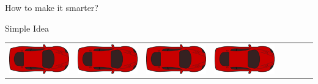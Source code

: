 \documentclass{do}
\begin{document}
\begin{frame}{How to make it smarter?}
\begin{exampleblock}{Simple Idea}
\begin{tabular}{c|c|c|c|c|c|c|c}
            \includegraphics[scale=0.30]{car.png}&
            \includegraphics[scale=0.30]{car.png}&
            \includegraphics[scale=0.30]{car.png}&
            \includegraphics[scale=0.30]{car.png}


\end{tabular}
\end{exampleblock}
\end{frame}
\end{document}
